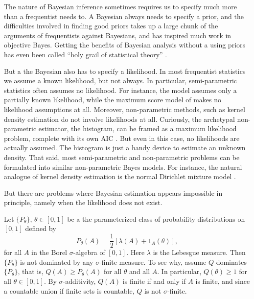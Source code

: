 The nature of Bayesian inference sometimes requires us to specify
much more than a frequentist needs to. A Bayesian always needs to
specify a prior, and the difficulties involved in finding good priors
takes up a large chunk of the arguments of frequentists against Bayesians,
and has inspired much work in objective Bayes. Getting the benefits
of Bayesian analysis without a using priors has even been called ``holy
grail of statistical theory'' \parencite{Efron2010-is}. 

But a the Bayesian also has to specify a likelihood. In most frequentist
statistics we assume a known likelihood, but not always. In particular,
semi-parametric statistics often assumes no likelihood. For instance,
the \textcite{Cox1972-xd} model assumes only a partially known likelihood,
while the maximum score model of \textcite{Manski1975-gl} makes no likelihood
assumptions at all. Moreover, non-parametric methods, such as kernel
density estimation \parencite{Silverman1986-nt} do not involve likelihoods
at all. Curiously, the archetypal non-parametric estimator, the histogram,
can be framed as a maximum likelihood problem, complete with its own
AIC \parencite{Birge2006-nl}. But even in this case, no likelihoods are
actually assumed. The histogram is just a handy device to estimate
an unknown density. That said, most semi-parametric and non-parametric
problems can be formulated into similar non-parametric Bayes models.
For instance, the natural analogue of kernel density estimation is
the normal Dirichlet mixture model \parencite[Chapter 2.2]{Muller2015-xn}.

But there are problems where Bayesian estimation appears impossible
in principle, namely when the likelihood does not exist.
\begin{example}
\label{exa:no likelihood}Let $\{P_{\theta}\},\,\theta\in[0,1]$
be a the parameterized class of probability distributions on $[0,1]$
defined by
\begin{equation}
P_{\theta}(A)=\frac{1}{2}[\lambda(A)+1_{A}(\theta)],\label{eq:no likelihood}
\end{equation}
for all $A$ in the Borel $\sigma$-algebra of $[0,1]$. Here $\lambda$
is the Lebesgue measure. Then $\{P_{\theta}\}$ is not dominated by
any $\sigma$-finite measure. To see why, assume $Q$ dominates $\{P_{\theta}\}$,
that is, $Q(A)\geq P_{\theta}(A)$ for all $\theta$ and all $A$.
In particular, $Q(\theta)\geq1$ for all $\theta\in[0,1]$. By $\sigma$-additivity,
$Q(A)$ is finite if and only if $A$ is finite, and since a countable
union if finite sets is countable, $Q$ is not $\sigma$-finite.
\end{example}

